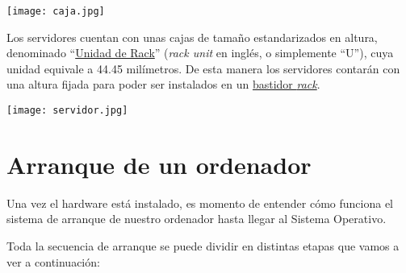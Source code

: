 \begin{center}
    \texttt{[image: caja.jpg]}
    \vspace{-10pt}
\end{center}


Los servidores cuentan con unas cajas de tamaño estandarizados en altura, denominado “\href{https://es.wikipedia.org/wiki/Unidad_rack}{Unidad de Rack}” (\textit{rack unit} en inglés, o simplemente “U”), cuya unidad equivale a 44.45 milímetros. De esta manera los servidores contarán con una altura fijada para poder ser instalados en un \href{https://es.wikipedia.org/wiki/Bastidor_de_19_pulgadas}{bastidor \textit{rack}}.

\begin{center}
    \texttt{[image: servidor.jpg]}
    \vspace{-10pt}
\end{center}


\section{Arranque de un ordenador}

Una vez el hardware está instalado, es momento de entender cómo funciona el sistema de arranque de nuestro ordenador hasta llegar al Sistema Operativo.

Toda la secuencia de arranque se puede dividir en distintas etapas que vamos a ver a continuación:

